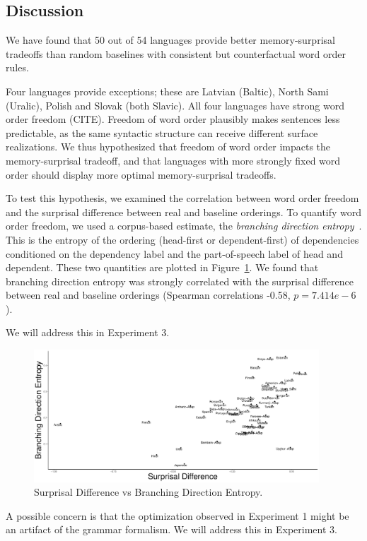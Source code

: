 \subsection{Discussion}

We have found that 50 out of 54 languages provide better memory-surprisal tradeoffs than random baselines with consistent but counterfactual word order rules.

Four languages provide exceptions; these are Latvian (Baltic), North Sami (Uralic), Polish and Slovak (both Slavic).
All four languages have strong word order freedom (CITE).
Freedom of word order plausibly makes sentences less predictable, as the same syntactic structure can receive different surface realizations.
We thus hypothesized that freedom of word order impacts the memory-surprisal tradeoff, and that languages with more strongly fixed word order should display more optimal memory-surprisal tradeoffs.

To test this hypothesis, we examined the correlation between word order freedom and the surprisal difference between real and baseline orderings.
To quantify word order freedom, we used a corpus-based estimate, the \emph{branching direction entropy}~\citep{futrell-quantifying-2015}.
This is the entropy of the ordering (head-first or dependent-first) of dependencies conditioned on the dependency label and the part-of-speech label of head and dependent.
These two quantities are plotted in Figure~\ref{fig:hist-real}.
We found that branching direction entropy was strongly correlated with the surprisal difference between real and baseline orderings (Spearman correlations -0.58, $p = 7.414e-6$).

We will address this in Experiment 3.


\begin{figure}
\includegraphics[width=0.95\textwidth]{figures/surprisal-branching-entropy-REAL.pdf}
	\caption{Surprisal Difference vs Branching Direction Entropy.}\label{fig:hist-real}
\end{figure}





A possible concern is that the optimization observed in Experiment 1 might be an artifact of the grammar formalism.
We will address this in Experiment 3.


